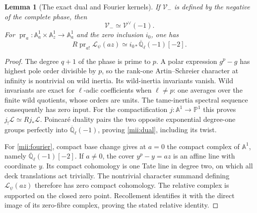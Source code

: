 \documentclass[11pt]{article}
\newtheorem{lemma}[theorem]{Lemma}
\renewcommand{\AA}{\mathbb A}
\newcommand{\QQl}{\overline{\mathbb Q}_\ell}
\begin{document}
\begin{lemma}[The exact dual and Fourier kernels]\label{mii:fourierlemma}
If $\mathcal V_-$ is defined by the negative of the complete phase, then
\begin{equation}\tag{MII4}\label{mii:dual}
 \mathcal V_-\simeq\mathcal V^\vee(-1).
\end{equation}
For $\operatorname{pr}_a:\AA_a^1\times\AA_z^1\to\AA_a^1$ and the zero
inclusion $i_0$, one has
\begin{equation}\tag{MII5}\label{mii:fourier}
 R\operatorname{pr}_{a!}\mathcal L_\psi(az)
       \simeq i_{0*}\QQl(-1)[-2].
\end{equation}
\end{lemma}
\begin{proof}
The degree $q+1$ of the phase is prime to $p$. A polar expression $g^p-g$
has highest pole order divisible by $p$, so the rank-one Artin--Schreier
character at infinity is nontrivial on wild inertia. Its wild-inertia
invariants vanish. Wild invariants are exact for $\ell$-adic coefficients
when $\ell\ne p$: one averages over the finite wild quotients, whose orders
are units. The tame-inertia spectral sequence consequently has zero input.
For the compactification $j:\AA^1\to\mathbb P^1$ this proves
$j_!\mathcal L\simeq Rj_*\mathcal L$. Poincar\'e duality pairs the two
opposite exponential degree-one groups perfectly into $\QQl(-1)$, proving
\eqref{mii:dual}, including its twist.

For \eqref{mii:fourier}, compact base change gives at $a=0$ the compact
complex of $\AA^1$, namely $\QQl(-1)[-2]$. If $a\ne0$, the cover
$y^p-y=az$ is an affine line with coordinate $y$. Its compact cohomology is
one Tate line in degree two, on which all deck translations act trivially.
The nontrivial character summand defining $\mathcal L_\psi(az)$ therefore
has zero compact cohomology. The relative complex is supported on the
closed zero point. Recollement identifies it with the direct image of its
zero-fibre complex, proving the stated relative identity.
\end{proof}
\end{document}
